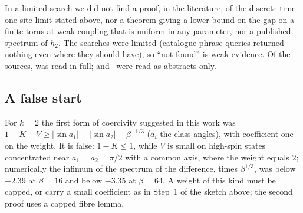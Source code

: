 In a limited search we did not find a proof, in the literature, of the discrete-time one-site limit stated
above, nor a theorem giving a lower bound on the gap on a finite torus at weak coupling that is uniform in
any parameter, nor a published spectrum of $h_2$. The searches were limited (catalogue phrase queries
returned nothing even where they should have), so ``not found'' is weak evidence.
Of the sources, \cite{vB00} was read in full; \cite{Lu83} and~\cite{LM84} were read as abstracts only.

\subsection{A false start}
For $k=2$ the first form of coercivity suggested in this work was
$1-K+V\ge|\sin a_1|+|\sin a_2|-\beta^{-1/3}$ ($a_i$ the class angles), with coefficient one on the weight.
It is false: $1-K\le1$, while $V$ is small on high-spin states concentrated near $a_1=a_2=\pi/2$ with a
common axis, where the weight equals $2$; numerically the infimum of the spectrum of the difference, times
$\beta^{1/3}$, was below $-2.39$ at $\beta=16$ and below $-3.35$ at $\beta=64$. A weight of this kind must be
capped, or carry a small coefficient as in Step~1 of the sketch above; the second proof uses a capped fibre
lemma.

